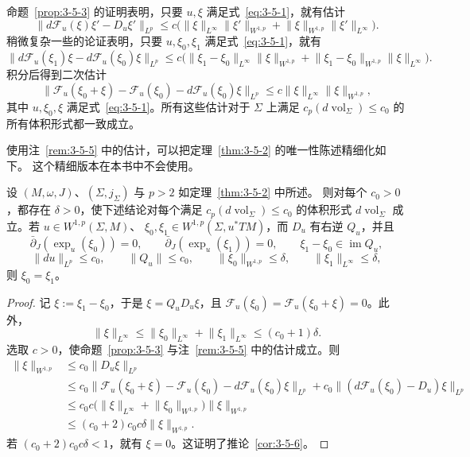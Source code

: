 \begin{remark}\label{rem:3-5-5}
命题~\ref{prop:3-5-3} 的证明表明，只要 $u,\xi$ 满足式~\eqref{eq:3-5-1}，就有估计
\[
  \lVert d\mathcal F_u(\xi)\xi'-D_u\xi'\rVert_{L^p}
  \le c\bigl(
  \lVert\xi\rVert_{L^\infty}\lVert\xi'\rVert_{W^{1,p}}
  +\lVert\xi\rVert_{W^{1,p}}\lVert\xi'\rVert_{L^\infty}
  \bigr).
\]
稍微复杂一些的论证表明，只要 $u,\xi_0,\xi_1$ 满足式~\eqref{eq:3-5-1}，就有
\[
  \lVert d\mathcal F_u(\xi_1)\xi-d\mathcal F_u(\xi_0)\xi\rVert_{L^p}
  \le c\bigl(
  \lVert\xi_1-\xi_0\rVert_{L^\infty}\lVert\xi\rVert_{W^{1,p}}
  +\lVert\xi_1-\xi_0\rVert_{W^{1,p}}\lVert\xi\rVert_{L^\infty}
  \bigr).
\]
积分后得到二次估计
\[
  \lVert\mathcal F_u(\xi_0+\xi)-\mathcal F_u(\xi_0)
  -d\mathcal F_u(\xi_0)\xi\rVert_{L^p}
  \le c\lVert\xi\rVert_{L^\infty}\lVert\xi\rVert_{W^{1,p}},
\]
其中 $u,\xi_0,\xi$ 满足式~\eqref{eq:3-5-1}。所有这些估计对于 $\Sigma$ 上满足
$c_p(d\operatorname{vol}_\Sigma)\le c_0$ 的所有体积形式都一致成立。
\end{remark}

使用注~\ref{rem:3-5-5} 中的估计，可以把定理~\ref{thm:3-5-2} 的唯一性陈述精细化如下。
这个精细版本在本书中不会使用。

\begin{corollary}\label{cor:3-5-6}
设 $(M,\omega,J)$、$(\Sigma,j_\Sigma)$ 与 $p>2$ 如定理~\ref{thm:3-5-2} 中所述。
则对每个 $c_0>0$，都存在 $\delta>0$，使下述结论对每个满足
$c_p(d\operatorname{vol}_\Sigma)\le c_0$ 的体积形式
$d\operatorname{vol}_\Sigma$ 成立。若
$u\in W^{1,p}(\Sigma,M)$、
$\xi_0,\xi_1\in W^{1,p}(\Sigma,u^*TM)$，而 $D_u$ 有右逆 $Q_u$，并且
\[
  \bar\partial_J(\exp_u(\xi_0))=0,\qquad
  \bar\partial_J(\exp_u(\xi_1))=0,\qquad
  \xi_1-\xi_0\in\operatorname{im}Q_u,
\]
\[
  \lVert du\rVert_{L^p}\le c_0,\qquad
  \lVert Q_u\rVert\le c_0,\qquad
  \lVert\xi_0\rVert_{W^{1,p}}\le\delta,\qquad
  \lVert\xi_1\rVert_{L^\infty}\le\delta,
\]
则 $\xi_0=\xi_1$。
\end{corollary}

\begin{proof}
记 $\xi:=\xi_1-\xi_0$，于是
$\xi=Q_uD_u\xi$，且
$\mathcal F_u(\xi_0)=\mathcal F_u(\xi_0+\xi)=0$。此外，
\[
  \lVert\xi\rVert_{L^\infty}
  \le\lVert\xi_0\rVert_{L^\infty}
  +\lVert\xi_1\rVert_{L^\infty}
  \le(c_0+1)\delta.
\]
选取 $c>0$，使命题~\ref{prop:3-5-3} 与注~\ref{rem:3-5-5} 中的估计成立。则
\begin{align*}
  \lVert\xi\rVert_{W^{1,p}}
  &\le c_0\lVert D_u\xi\rVert_{L^p}\\
  &\le c_0\lVert
    \mathcal F_u(\xi_0+\xi)-\mathcal F_u(\xi_0)
    -d\mathcal F_u(\xi_0)\xi
    \rVert_{L^p}
    +c_0\lVert(d\mathcal F_u(\xi_0)-D_u)\xi\rVert_{L^p}\\
  &\le c_0c\bigl(
    \lVert\xi\rVert_{L^\infty}
    +\lVert\xi_0\rVert_{W^{1,p}}
    \bigr)\lVert\xi\rVert_{W^{1,p}}\\
  &\le(c_0+2)c_0c\delta\lVert\xi\rVert_{W^{1,p}}.
\end{align*}
若 $(c_0+2)c_0c\delta<1$，就有 $\xi=0$。这证明了推论~\ref{cor:3-5-6}。
\end{proof}

